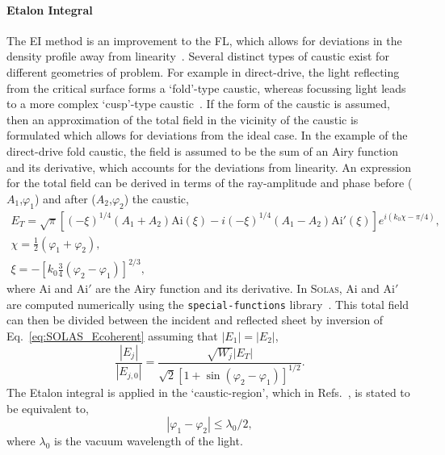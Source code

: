 \paragraph*{Etalon Integral}
The \ac{EI} method is an improvement to the \ac{FL}, which allows for deviations in the density profile away from linearity~\cite{colaitis_real_2019,kravcov_caustics_1999,kratsov_theory_2010}.
Several distinct types of caustic exist for different geometries of problem.
For example in direct-drive, the light reflecting from the critical surface forms a `fold'-type caustic, whereas focussing light leads to a more complex `cusp'-type caustic~\cite{lopez_metaplectic_2022}.
If the form of the caustic is assumed, then an approximation of the total field in the vicinity of the caustic is formulated which allows for deviations from the ideal case.
In the example of the direct-drive fold caustic, the field is assumed to be the sum of an Airy function and its derivative, which accounts for the deviations from linearity.
An expression for the total field can be derived in terms of the ray-amplitude and phase before ($A_1$,$\varphi_1$) and after ($A_2$,$\varphi_2$) the caustic,
\begin{equation}
    \begin{gathered}
        E_T = \sqrt{\pi}\left[(-\xi)^{1/4}(A_1+A_2)\text{Ai}(\xi) - i(-\xi)^{1/4}(A_1-A_2)\text{Ai}'(\xi)  \right]e^{i(k_0\chi - \pi/4)}, \\
        \chi = \frac{1}{2}(\varphi_1+\varphi_2), \\
        \xi = -\left[ k_0\frac{3}{4}(\varphi_2-\varphi_1)  \right]^{2/3},
    \end{gathered}
\end{equation}
where $\text{Ai}$ and $\text{Ai}'$ are the Airy function and its derivative.
In \textsc{Solas}, $\text{Ai}$ and $\text{Ai}'$ are computed numerically using the \texttt{special-functions} library~\cite{chang_computation_1996}.
This total field can then be divided between the incident and reflected sheet by inversion of Eq.~\ref{eq:SOLAS_Ecoherent} assuming that $|E_1|=|E_2|$,
\begin{equation}
    \frac{\left|E_j\right|}{\left|E_{j, 0}\right|}=\frac{\sqrt{W_j}\left|E_T\right|}{\sqrt{2}\left[1+\sin \left(\varphi_2-\varphi_1\right)\right]^{1 / 2}}.
\end{equation}
The Etalon integral is applied in the `caustic-region', which in Refs.~\cite{asatryan_fresnel_1988,kravtsov_iv_1988,colaitis_real_2019}, is stated to be equivalent to,
\begin{equation}%
    \label{eq:SOLAS_causticregion}
    |\varphi_1-\varphi_2|\leq\lambda_0/2,
\end{equation}
where $\lambda_0$ is the vacuum wavelength of the light.

